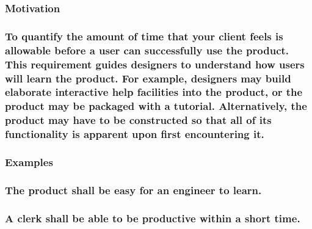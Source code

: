 \documentclass[
]{article}
\begin{document}
\hypertarget{motivation-33}{%
\subsubsection{Motivation}\label{motivation-33}}

\hypertarget{to-quantify-the-amount-of-time-that-your-client-feels-is-allowable-before-a-user-can-successfully-use-the-product.-this-requirement-guides-designers-to-understand-how-users-will-learn-the-product.-for-example-designers-may-build-elaborate-interactive-help-facilities-into-the-product-or-the-product-may-be-packaged-with-a-tutorial.-alternatively-the-product-may-have-to-be-constructed-so-that-all-of-its-functionality-is-apparent-upon-first-encountering-it.}{%
\subsubsection{To quantify the amount of time that your client feels is
allowable before a user can successfully use the product. This
requirement guides designers to understand how users will learn the
product. For example, designers may build elaborate interactive help
facilities into the product, or the product may be packaged with a
tutorial. Alternatively, the product may have to be constructed so that
all of its functionality is apparent upon first encountering
it.}\label{to-quantify-the-amount-of-time-that-your-client-feels-is-allowable-before-a-user-can-successfully-use-the-product.-this-requirement-guides-designers-to-understand-how-users-will-learn-the-product.-for-example-designers-may-build-elaborate-interactive-help-facilities-into-the-product-or-the-product-may-be-packaged-with-a-tutorial.-alternatively-the-product-may-have-to-be-constructed-so-that-all-of-its-functionality-is-apparent-upon-first-encountering-it.}}

\hypertarget{examples-18}{%
\subsubsection{Examples}\label{examples-18}}

\hypertarget{the-product-shall-be-easy-for-an-engineer-to-learn.}{%
\subsubsection{The product shall be easy for an engineer to
learn.}\label{the-product-shall-be-easy-for-an-engineer-to-learn.}}

\hypertarget{a-clerk-shall-be-able-to-be-productive-within-a-short-time.}{%
\subsubsection{A clerk shall be able to be productive within a short
time.}\label{a-clerk-shall-be-able-to-be-productive-within-a-short-time.}}
\end{document}
